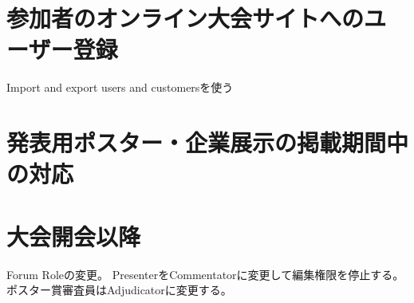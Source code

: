\documentclass[titlepage,10pt,a4paper,uplatex]{jsbook}
\begin{document}
\section{参加者のオンライン大会サイトへのユーザー登録}

Import and export users and customersを使う

\section{発表用ポスター・企業展示の掲載期間中の対応}

\section{大会開会以降}

Forum Roleの変更。
PresenterをCommentatorに変更して編集権限を停止する。
ポスター賞審査員はAdjudicatorに変更する。


\end{document}
